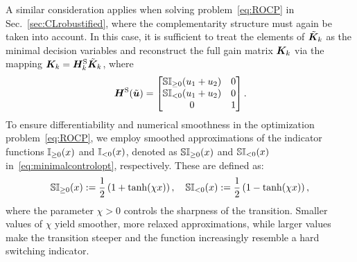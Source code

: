 A similar consideration applies when solving problem~\eqref{eq:ROCP} in Sec.~\ref{sec:CLrobustified}, where the complementarity structure must again be taken into account. In this case, it is sufficient to treat the elements of $\tilde{\boldsymbol{K}}_k$ as the minimal decision variables and reconstruct the full gain matrix $\boldsymbol{K}_k$ via the mapping $\boldsymbol{K}_k = \boldsymbol{H}_k^{\text{S}} \tilde{\boldsymbol{K}}_k$, where
\begin{equation} \label{eq:minimalcontrolopt}
\bH^{\text{S}}(\tilde{\bu}) =
\begin{bmatrix}
\SIpos{u_1+u_2} & 0 \\
\SIneg{u_1+u_2} & 0 \\
0 & 1
\end{bmatrix}. 
\end{equation}
To ensure differentiability and numerical smoothness in the optimization problem~\eqref{eq:ROCP}, we employ smoothed approximations of the indicator functions $\mathbb{I}_{\geq 0}(x)$ and $\mathbb{I}_{< 0}(x)$, denoted as $\mathbb{SI}_{\geq 0}(x)$ and $\mathbb{SI}_{ < 0}(x)$ in~\eqref{eq:minimalcontrolopt}, respectively. These are defined as:
\begin{equation} \label{eq:smoothedindicator}
\SIpos{x} :=
\frac{1}{2} \left(1 + \tanh(\chi x)\right), \quad \SIneg{x} := \frac{1}{2}\left(1 - \tanh(\chi x) \right),
\end{equation}
where the parameter $\chi>0$ controls the sharpness of the transition. Smaller values of $\chi$ yield smoother, more relaxed approximations, while larger values make the transition steeper and the function increasingly resemble a hard switching indicator.
 
